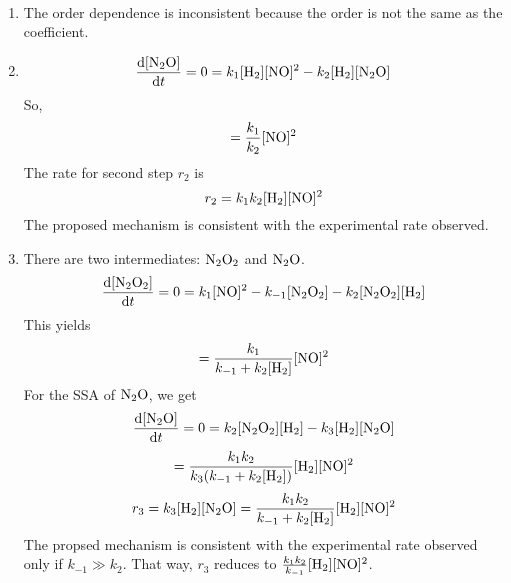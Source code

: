 \begin{solution}\
    \begin{enumerate}
        \item The order dependence is inconsistent because the order is not the same as the coefficient.
        \item \begin{equation*}
                  \dd{[\ce{N_2O}]}{t}=0=k_1[\ce{H_2}][\ce{NO}]^2-k_2[\ce{H_2}][\ce{N_2O}]
              \end{equation*}
              So,
              \begin{equation*}
                  [\ce{N_2O}]=\frac{k_1}{k_2}[\ce{NO}]^2
              \end{equation*}
              The rate for second step $r_2$ is
              \begin{equation*}
                  r_2=k_1k_2[\ce{H_2}][\ce{NO}]^2
              \end{equation*}
              The proposed mechanism is consistent with the experimental rate observed.
        \item There are two intermediates: $\ce{N_2O_2}$ and $\ce{N_2O}$.
              \begin{equation*}
                  \dd{[\ce{N_2O_2}]}{t}=0=k_1[\ce{NO}]^2-k_{-1}[\ce{N_2O_2}]-k_2[\ce{N_2O_2}][\ce{H_2}]
              \end{equation*}
              This yields
              \begin{equation*}
                  [\ce{N_2O_2}]=\frac{k_1}{k_{-1}+k_2[\ce{H_2}]}[\ce{NO}]^2
              \end{equation*}
              For the SSA of $\ce{N_2O}$, we get
              \begin{equation*}
                  \dd{[\ce{N_2O}]}{t}=0=k_2[\ce{N_2O_2}][\ce{H_2}]-k_3[\ce{H_2}][\ce{N_2O}]
              \end{equation*}
              \begin{equation*}
                  [\ce{N_2O}]=\frac{k_1k_2}{k_3(k_{-1}+k_2[\ce{H_2}])}[\ce{H_2}][\ce{NO}]^2
              \end{equation*}
              \begin{equation*}
                  r_3=k_3[\ce{H_2}][\ce{N_2O}]=\frac{k_1k_2}{k_{-1}+k_2[\ce{H_2}]}[\ce{H_2}][\ce{NO}]^2
              \end{equation*}
              The propsed mechanism is consistent with the experimental rate observed only if
              $k_{-1}\gg k_2$. That way, $r_3$ reduces to $\frac{k_1 k_2}{k_{-1}}[\ce{H_2}][\ce{NO}]^2$.
    \end{enumerate}
\end{solution}

